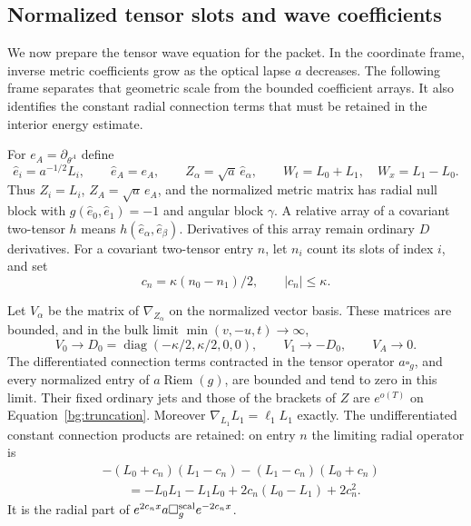 \subsection{Normalized tensor slots and wave coefficients}

We now prepare the tensor wave equation for the packet. In the
coordinate frame, inverse metric coefficients grow as the optical lapse
$a$ decreases. The following frame separates that geometric scale from
the bounded coefficient arrays. It also identifies the constant radial
connection terms that must be retained in the interior energy estimate.

For $e_A=\partial_{\theta^A}$ define
\begin{equation}\label{bg:frames}
 \hat e_i=a^{-1/2}L_i,\qquad \hat e_A=e_A,\qquad
 Z_\alpha=\sqrt a\,\hat e_\alpha,\qquad
 W_t=L_0+L_1,\quad W_x=L_1-L_0.
\end{equation}
Thus $Z_i=L_i$, $Z_A=\sqrt a\,e_A$, and the normalized metric
matrix has radial null block with $g(\hat e_0,\hat e_1)=-1$ and
angular block $\gamma$.  A relative array of a covariant two-tensor
$h$ means $h(\hat e_\alpha,\hat e_\beta)$.  Derivatives of this
array remain ordinary $D$ derivatives.  For a covariant two-tensor
entry $n$, let $n_i$ count its slots of index $i$, and set
\begin{equation}\label{bg:slot-weight}
                c_n=\kappa(n_0-n_1)/2,\qquad |c_n|\le\kappa.
\end{equation}

\begin{lemma}\label{bg:coefficients}
Let $V_\alpha$ be the matrix of $\nabla_{Z_\alpha}$ on the
normalized vector basis.  These matrices are bounded, and in the
bulk limit $\min(v,-u,t)\to\infty$,
\begin{equation}\label{bg:connection-limits}
 V_0\longrightarrow D_0=\operatorname{diag}(-\kappa/2,\kappa/2,0,0),
 \qquad V_1\longrightarrow-D_0,\qquad V_A\longrightarrow0.
\end{equation}
The differentiated connection terms contracted in the tensor
operator $a\square_g$, and every normalized entry of
$a\operatorname{Riem}(g)$, are bounded and tend to zero in this
limit.  Their fixed ordinary jets and those of the brackets of $Z$
are $e^{o(T)}$ on Equation~\eqref{bg:truncation}.  Moreover
$\nabla_{L_1}L_1=\ell_1L_1$ exactly.
The undifferentiated constant connection products are retained:
on entry $n$ the limiting radial operator is
\begin{equation}\label{bg:radial-conjugation}
\begin{split}
 &-(L_0+c_n)(L_1-c_n)-(L_1-c_n)(L_0+c_n)\\
 &\qquad=-L_0L_1-L_1L_0+2c_n(L_0-L_1)+2c_n^2.
\end{split}
\end{equation}
It is the radial part of
$e^{2c_nx}a\square_g^{\rm scal}e^{-2c_nx}$.
\end{lemma}

